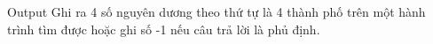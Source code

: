Output
Ghi ra 4 số nguyên dương theo thứ tự là 4 thành phố trên một hành trình tìm được hoặc ghi số -1 nếu câu trả lời là phủ định.